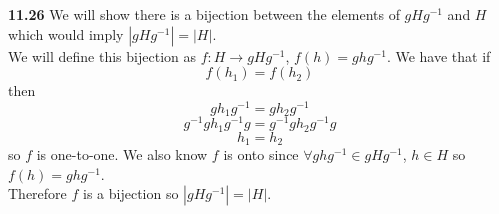 \documentclass[12pt]{article}
\newenvironment{ques}{\vspace{2 ex}}{\vspace{2 ex}}
\theoremstyle{definition}
\begin{document}
\begin{ques} 
	\textbf{11.26} 
		We will show there is a bijection between the elements of
		$gHg^{-1}$ and $H$ which would imply $|gHg^{-1}| = |H|$.\\
		We will define this bijection as $f : H \to gHg^{-1}$, $f(h) =
		ghg^{-1}$. We have that if
		$$f(h_1) = f(h_2)$$
		then 
		$$gh_1g^{-1} = gh_2g^{-1}$$
		$$g^{-1}g h_1 g^{-1} g = g^{-1}gh_2g^{-1}g$$
		$$h_1 = h_2$$
		so $f$ is one-to-one. We also know $f$ is onto since $\forall
		ghg^{-1} \in gHg^{-1}$, $h \in H$ so $f(h) = ghg^{-1}$.\\
		Therefore $f$ is a bijection so $|gHg^{-1}| = |H|$.
\end{ques}
\end{document}
